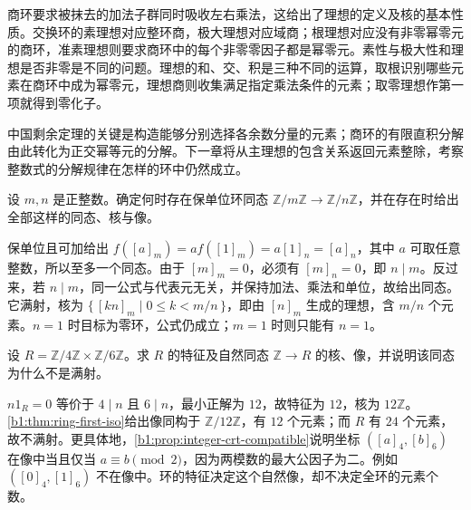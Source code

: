 




\begin{chaptersummary}
	商环要求被抹去的加法子群同时吸收左右乘法，这给出了理想的定义及核的基本性质。交换环的素理想对应整环商，极大理想对应域商；根理想对应没有非零幂零元的商环，准素理想则要求商环中的每个非零零因子都是幂零元。素性与极大性和理想是否非零是不同的问题。理想的和、交、积是三种不同的运算，取根识别哪些元素在商环中成为幂零元，理想商则收集满足指定乘法条件的元素；取零理想作第一项就得到零化子。

	\ProseParagraphBreak
	中国剩余定理的关键是构造能够分别选择各余数分量的元素；商环的有限直积分解由此转化为正交幂等元的分解。下一章将从主理想的包含关系返回元素整除，考察整数式的分解规律在怎样的环中仍然成立。
\end{chaptersummary}

\BookExercises

\begin{exercise}\label{b1:ex:10-residue-hom}
	设 \(m,n\) 是正整数。确定何时存在保单位环同态 \(\mathbb Z/m\mathbb Z\rightarrow\mathbb Z/n\mathbb Z\)，并在存在时给出全部这样的同态、核与像。
\end{exercise}
\begin{solution}
	保单位且可加给出 \(f([a]_m)=a f([1]_m)=a[1]_n=[a]_n\)，其中 \(a\) 可取任意整数，所以至多一个同态。由于 \([m]_m=0\)，必须有 \([m]_n=0\)，即 \(n\mid m\)。反过来，若 \(n\mid m\)，同一公式与代表元无关，并保持加法、乘法和单位，故给出同态。它满射，核为 \(\bigl\{\,[kn]_m\mid0\leq k<m/n\,\bigr\}\)，即由 \([n]_m\) 生成的理想，含 \(m/n\) 个元素。\(n=1\) 时目标为零环，公式仍成立；\(m=1\) 时则只能有 \(n=1\)。
\end{solution}

\begin{exercise}\label{b1:ex:10-characteristic-product}
	设 \(R=\mathbb Z/4\mathbb Z\times\mathbb Z/6\mathbb Z\)。求 \(R\) 的特征及自然同态 \(\mathbb Z\rightarrow R\) 的核、像，并说明该同态为什么不是满射。
\end{exercise}
\begin{solution}
	\(n1_R=0\) 等价于 \(4\mid n\) 且 \(6\mid n\)，最小正解为 \(12\)，故特征为 \(12\)，核为 \(12\mathbb Z\)。\cref{b1:thm:ring-first-iso}给出像同构于 \(\mathbb Z/12\mathbb Z\)，有 \(12\) 个元素；而 \(R\) 有 \(24\) 个元素，故不满射。更具体地，\cref{b1:prop:integer-crt-compatible}说明坐标 \(([a]_4,[b]_6)\) 在像中当且仅当 \(a\equiv b\pmod2\)，因为两模数的最大公因子为二。例如 \(([0]_4,[1]_6)\) 不在像中。环的特征决定这个自然像，却不决定全环的元素个数。
\end{solution}

